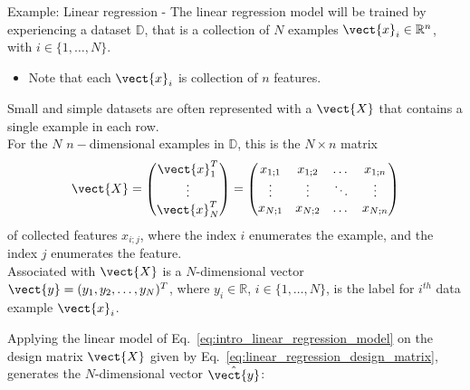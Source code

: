 \begin{frame}[t,allowframebreaks]{
    Example: Linear regression - }
    The \gls{linear regression} model will be trained
    by experiencing a dataset $\mathbb{D}$,
    that is a collection of $N$ examples $\vect{x}_i \in \mathbb{R}^n$,
    with $i \in \{1,\dots,N\}$.\\
    \begin{itemize}
     \item Note that each $\vect{x}_i$ is collection of $n$ features.\\
    \end{itemize}
    \vspace{0.1cm}
    Small and simple datasets are often represented with a 
     $\vect{X}$
    that contains a single example in each row.\\
    \vspace{0.1cm}
    For the $N$ $n-$dimensional examples in $\mathbb{D}$, 
    this is the $N \times n$ matrix
    \begin{equation}
        \vect{X} = 
        \begin{pmatrix}
            \vect{x}_1^T\\
            \vdots\\
            \vect{x}_N^T\\
        \end{pmatrix} =
        \begin{pmatrix}
            x_{1;1} & x_{1;2} & \dots  & x_{1;n} \\
            \vdots  & \vdots  & \ddots & \vdots  \\
            x_{N;1} & x_{N;2} & \dots  & x_{N;n} \\
        \end{pmatrix}
        \label{eq:linear_regression_design_matrix}
    \end{equation}
    of collected features $x_{i;j}$, 
    where the index $i$ enumerates the example, 
    and the index $j$ enumerates the feature.\\
    \vspace{0.1cm}
    Associated with $\vect{X}$ is a $N$-dimensional vector 
    $\vect{y} = (y_1, y_2, \dots, y_N)^{T}$, 
    where $y_i \in \mathbb{R}$, $i \in \{1,\dots,N\}$, is the label
    for $i^{th}$ data example $\vect{x}_i$.\\

    \framebreak


    Applying the linear model of Eq.~\ref{eq:intro_linear_regression_model}
    on the \gls{design matrix} $\vect{X}$ given by 
    Eq.~\ref{eq:linear_regression_design_matrix},
    generates the $N$-dimensional vector $\hat{\vect{y}}$: 


\end{frame}
